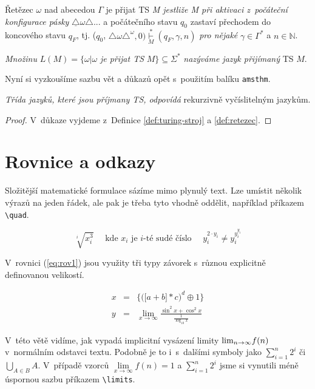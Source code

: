 \documentclass[twocolumn, a4paper, titlepage, 11pt]{article}
\begin{document}
\begin{definition}\label{def:retezec}
Řetězec $\omega$ nad abecedou $\Gamma$ je přijat TS \emph{M jestliže M při aktivaci z~počáteční konfigurace pásky} $\underline {\triangle} \omega \triangle $... a počátečního stavu $q_0$ zastaví přechodem do koncového stavu $q_F$, tj. ($q_0$, $\triangle\omega\triangle ^ \omega, 0) \overset{*}{\underset{M}{\vdash}}(q_F, \gamma, n)$ \emph{pro nějaké} $\gamma \in \Gamma ^ *$ a $n \in \mathbb{N} $.

\emph{Množinu} $L(M) = \{\omega | \omega$ \emph{je přijat TS} $M\} \subseteq \Sigma^*$ \emph{nazýváme jazyk přijímaný} TS $M$. 

\end{definition}

Nyní si vyzkoušíme sazbu vět a důkazů opět s~použitím balíku \texttt{amsthm}.

\begin{sentence} \label{veta1}
\emph{Třída jazyků, které jsou příjmany TS, odpovídá} rekurzivně vyčíslitelným jazykům.
\end{sentence}


\begin{proof}
V~důkaze vyjdeme z~Definice \ref{def:turing-stroj} a \ref{def:retezec}.
\end{proof}




\section{Rovnice a odkazy}

Složitější matematické formulace sázíme mimo ply\-nulý text. Lze umístit
několik výrazů na jeden řádek, ale pak je třeba tyto vhodně oddělit, například příka\-zem \verb|\quad|.

$$\sqrt[i]{x^3_i} \quad \text{ kde } x_i \text{ je } i\text{-té sudé číslo } \quad y_i^{2 \cdot y_i} \neq y_i^{y_i^{y_i}}$$

V~rovnici (\ref{eq:rov1}) jsou využity tři typy závorek s~různou explicitně definovanou
velikostí.

\begin{eqnarray} \label{eq:rov1}
x & = & \bigg\{ \Big( \big[a+b \big] * c \Big)^d \oplus 1 \bigg\}\\
y & = & \lim\limits_{x \rightarrow \infty} \frac{\sin^2 x + \cos^2 x}{\frac{1}{\log_{10}x}} \nonumber
\end{eqnarray}



V~této větě vidíme, jak vypadá implicitní vysázení limity $\textup{lim}_{n \rightarrow \infty}f(n)$ v~normálním odstavci textu. Po\-dobně je to i~s~dalšími symboly jako $\sum_{i=1}^{n}2^i$ či $\bigcup_{A \in B}A$. V~případě vzorců $\lim\limits_{x \rightarrow \infty} f(n) = 1$ a $\sum\limits_{i=1}^{n}2^i$ jsme si vynutili méně úspornou sazbu příkazem \verb|\limits|.
\end{document}
